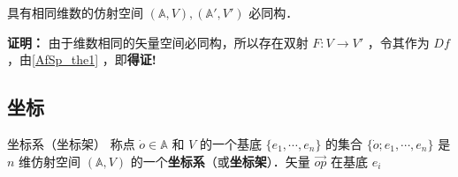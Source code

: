 \begin{corollary}{}
具有相同维数的仿射空间 $(\mathbb A,V),(\mathbb A',V')$ 必同构．
\end{corollary}
\textbf{证明：} 由于维数相同的矢量空间必同构，所以存在双射 $F:V\rightarrow V'$ ，令其作为 $Df$ ，由\autoref{AfSp_the1} ，即\textbf{得证!}
\subsection{坐标}
\begin{definition}{坐标系（坐标架）}
称点 $\dot o\in\mathbb A$ 和 $V$ 的一个基底 $\{e_1,\cdots,e_n\}$ 的集合 $\{\dot o;e_1,\cdots,e_n\}$ 是 $n$ 维仿射空间 $(\mathbb A,V)$ 的一个\textbf{坐标系}（或\textbf{坐标架}）．矢量 $\vec{op}$ 在基底 ${e_i}$ 
\end{definition}